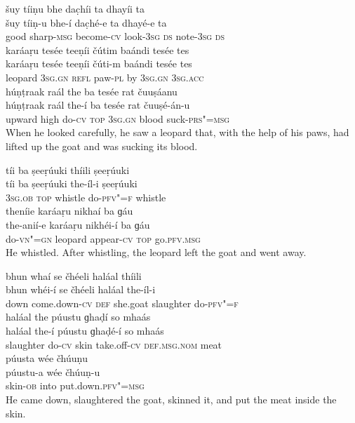 \begin{exe}
\ex
\label{ex:5}
\glll šuy	tíiṇu	bhe	dac̣híi	ta	dhayíi	ta \\
šuy	tíiṇ-u	bhe-í	dac̣hé-e	ta	dhayé-e	ta \\
good	sharp-\textsc{msg}	become-\textsc{cv}	look-\textsc{3sg} \textsc{ds}	note-\textsc{3sg} \textsc{ds} \\
\glll karáaṛu	tesée	teeṇíi	čútim	baándi	tesée	tes \\
karáaṛu	tesée	teeṇíi	čúti-m	baándi	tesée	tes \\
leopard	\textsc{3sg.gn} \textsc{refl}	paw-\textsc{pl}	by	\textsc{3sg.gn} \textsc{3sg.acc} \\
\glll húṇṭraak	raál	the	ba	tesée	rat čuuṣáanu \\
húṇṭraak	raál	the-í	ba	tesée	rat čuuṣé-án-u \\
upward	high	do-\textsc{cv}	\textsc{top} \textsc{3sg.gn}	blood suck-\textsc{prs"=msg} \\
\glt When he looked carefully, he saw a leopard that, with the help of his paws, had lifted up the goat and was sucking its blood.

\ex
\label{ex:6}
\glll tíi	ba	ṣeeṛúuki	thíili	ṣeeṛúuki \\
tíi	ba	ṣeeṛúuki	the-íl-i	ṣeeṛúuki \\
\textsc{3sg.ob}	\textsc{top}	whistle	do-\textsc{pfv"=f}	whistle \\
\glll theníie	karáaṛu	nikhaí	ba	ɡáu \\
the-anií-e	karáaṛu	nikhéi-í	ba	ɡáu \\
do-\textsc{vn"=gn}	leopard	appear-\textsc{cv} \textsc{top}	go.\textsc{pfv.msg} \\
\glt He whistled. After whistling, the leopard left the goat and went away.

\ex
\label{ex:7}
\glll bhun	whaí	se	čhéeli	haláal	thíili \\
bhun	whéi-í	se	čhéeli	haláal	the-íl-i \\
down	come.down-\textsc{cv} \textsc{def}	she.goat	slaughter	do-\textsc{pfv"=f} \\
\glll haláal	the	púustu	ɡhaḍí	so	mhaás \\
haláal	the-í	púustu	ɡhaḍé-í	so	mhaás \\
slaughter	do-\textsc{cv}	skin	take.off-\textsc{cv} \textsc{def.msg.nom}	meat \\
\glll púusta	wée	čhúuṇu\\
púustu-a	wée	čhúuṇ-u\\
skin-\textsc{ob}	into	put.down.\textsc{pfv"=msg}\\
\glt He came down, slaughtered the goat, skinned it, and put the meat inside the skin.


\end{exe}

